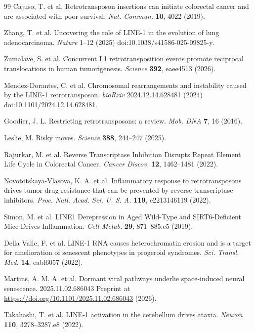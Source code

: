 \documentclass[11pt,twocolumn,twoside]{extarticle}
\begin{document}
\begin{thebibliography}{99}
 Cajuso, T. et al. Retrotransposon insertions can initiate colorectal cancer and are associated with poor survival. \textit{Nat. Commun.} \textbf{10}, 4022 (2019).

 Zhang, T. et al. Uncovering the role of LINE-1 in the evolution of lung adenocarcinoma. \textit{Nature} 1--12 (2025) doi:10.1038/s41586-025-09825-y.

 Zumalave, S. et al. Concurrent L1 retrotransposition events promote reciprocal translocations in human tumorigenesis. \textit{Science} \textbf{392}, eaee4513 (2026).

 Mendez-Dorantes, C. et al. Chromosomal rearrangements and instability caused by the LINE-1 retrotransposon. \textit{bioRxiv} 2024.12.14.628481 (2024) doi:10.1101/2024.12.14.628481.

 Goodier, J. L. Restricting retrotransposons: a review. \textit{Mob. DNA} \textbf{7}, 16 (2016).

 Leslie, M. Risky moves. \textit{Science} \textbf{388}, 244--247 (2025).

 Rajurkar, M. et al. Reverse Transcriptase Inhibition Disrupts Repeat Element Life Cycle in Colorectal Cancer. \textit{Cancer Discov.} \textbf{12}, 1462--1481 (2022).

 Novototskaya-Vlasova, K. A. et al. Inflammatory response to retrotransposons drives tumor drug resistance that can be prevented by reverse transcriptase inhibitors. \textit{Proc. Natl. Acad. Sci. U. S. A.} \textbf{119}, e2213146119 (2022).

 Simon, M. et al. LINE1 Derepression in Aged Wild-Type and SIRT6-Deficient Mice Drives Inflammation. \textit{Cell Metab.} \textbf{29}, 871--885.e5 (2019).

 Della Valle, F. et al. LINE-1 RNA causes heterochromatin erosion and is a target for amelioration of senescent phenotypes in progeroid syndromes. \textit{Sci. Transl. Med.} \textbf{14}, eabl6057 (2022).

 Martins, A. M. A. et al. Dormant viral pathways underlie space-induced neural senescence. 2025.11.02.686043 Preprint at \url{https://doi.org/10.1101/2025.11.02.686043} (2026).

 Takahashi, T. et al. LINE-1 activation in the cerebellum drives ataxia. \textit{Neuron} \textbf{110}, 3278--3287.e8 (2022).


\end{thebibliography}
\end{document}
